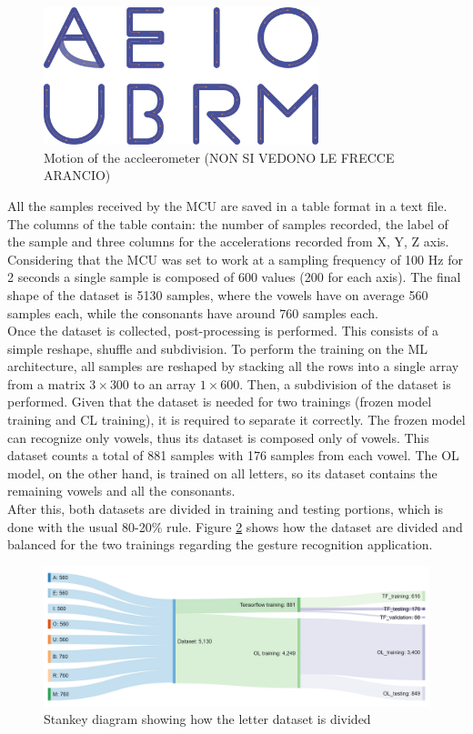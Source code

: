 \documentclass[12pt]{report}
\begin{document}
\begin{figure}[h!]
    \centering
    \includegraphics[width=80mm]{Figures/Chapter4/letters_motion.jpg} 
    \caption{Motion of the accleerometer (NON SI VEDONO LE FRECCE ARANCIO)}
    \label{fig:letters_motion}    
\end{figure}

All the samples received by the MCU are saved in a table format in a text file. The columns of the table contain: the number of samples recorded, the label of the sample and three columns for the accelerations recorded from X, Y, Z axis. Considering that the MCU was set to work at a sampling frequency of 100 Hz for 2 seconds a single sample is composed of 600 values (200 for each axis). 
The final shape of the dataset is 5130 samples, where the vowels have on average 560 samples each, while the consonants have around 760 samples each. \\
Once the dataset is collected, post-processing is performed. This consists of a simple reshape, shuffle and subdivision. To perform the training on the ML architecture, all samples are reshaped by stacking all the rows into a single array from a matrix $3 \times 300$ to an array $1 \times 600$. Then, a subdivision of the dataset is performed. Given that the dataset is needed for two trainings (frozen model training and CL training), it is required to separate it correctly. The frozen model can recognize only vowels, thus its dataset is composed only of vowels. This dataset counts a total of 881 samples with 176 samples from each vowel. The OL model, on the other hand, is trained on all letters, so its dataset contains the remaining vowels and all the consonants. \\
After this, both datasets are divided in training and testing portions, which is done with the usual 80-20\% rule. Figure \ref{fig:flow_dataset_letters} shows how the dataset are divided and balanced for the two trainings regarding the gesture recognition application.

\begin{figure}[h!]
    \centering
    \includegraphics[width=140mm]{Figures/Chapter4/flow_dataset_letters.png} 
    \caption{Stankey diagram showing how the letter dataset is divided}
    \label{fig:flow_dataset_letters}    
\end{figure}
\end{document}

